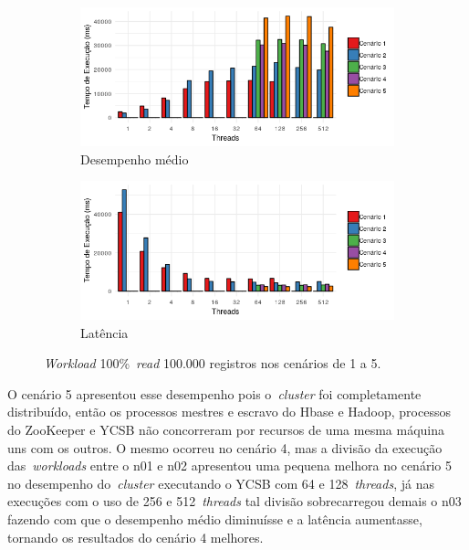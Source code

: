 \documentclass[12pt]{article}
\begin{document}
\begin{figure}
    \centering
    \begin{subfigure}[b]{0.49\textwidth}   
        \centering 
        \includegraphics[width=\textwidth]{images/figura13}
        \caption{Desempenho médio}
        \label{figura13}
    \end{subfigure}
    \begin{subfigure}[b]{0.49\textwidth}   
        \centering 
        \includegraphics[width=\textwidth]{images/figura14}
        \caption{Latência}
        \label{figura14}
    \end{subfigure}
    \caption{\emph{Workload} 100\%~\emph{read} 100.000 registros nos cenários de 1 a 5.}
\end{figure}

O cenário 5 apresentou esse desempenho pois o~\emph{cluster} foi completamente distribuído, então os processos mestres e escravo do Hbase e Hadoop, processos do ZooKeeper e YCSB não concorreram por recursos de uma mesma máquina uns com os outros. O mesmo ocorreu no cenário 4, mas a divisão da execução das~\emph{workloads} entre o n01 e n02 apresentou uma pequena melhora no cenário 5 no desempenho do~\emph{cluster} executando o YCSB com 64 e 128~\emph{threads}, já nas execuções com o uso de 256 e 512~\emph{threads} tal divisão sobrecarregou demais o n03 fazendo com que o desempenho médio diminuísse e a latência aumentasse, tornando os resultados do cenário 4 melhores.
\end{document}
